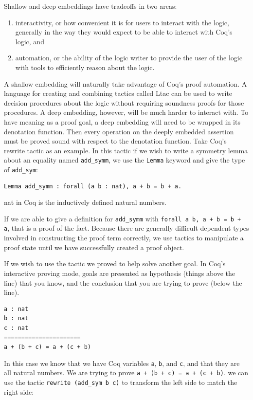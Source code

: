 \documentclass{puthesis}
\begin{document}
Shallow and deep embeddings have tradeoffs in two areas:

\begin{enumerate}
\item interactivity, or how convenient it is for users to interact
  with the logic, generally in the way they would expect to be able to
  interact with Coq's logic, and
\item automation, or the ability of the logic writer to provide the
  user of the logic with tools to efficiently reason about the logic.
\end{enumerate}

A shallow embedding will naturally take advantage of Coq's proof
automation. A language for creating and combining tactics called Ltac
can be used to write decision procedures about the logic without
requiring soundness proofs for those procedures. A deep embedding,
however, will be much harder to interact with. To have meaning as a
proof goal, a deep embedding will need to be wrapped in its denotation
function. Then every operation on the deeply embedded assertion must
be proved sound with respect to the denotation function. Take Coq's
rewrite tactic as an example. In this tactic if we wish to write a
symmetry lemma about an equality named \lstinline|add_symm|, we use
the \lstinline|Lemma| keyword and give the type of
\lstinline|add_sym|:

\begin{lstlisting}
Lemma add_symm : forall (a b : nat), a + b = b + a.
\end{lstlisting}
\noindent nat in Coq is the inductively defined natural numbers.

If we are able to give a definition for \lstinline|add_symm| with
\lstinline|forall a b, a + b = b + a|, that is a proof of the
fact. Because there are generally difficult dependent types involved
in constructing the proof term correctly, we use tactics to manipulate
a proof state until we have successfully created a proof object. 

If we wish to use the tactic we proved to help solve another goal. In
Coq's interactive proving mode, goals are presented as hypothesis
(things above the line) that you know, and the conclusion that you are
trying to prove (below the line). 

\begin{lstlisting}
a : nat
b : nat
c : nat
======================
a + (b + c) = a + (c + b) 
\end{lstlisting}

In this case we know that we have Coq variables \lstinline|a|,
\lstinline|b|, and \lstinline|c|, and that they are all natural
numbers. We are trying to prove \lstinline|a + (b + c) = a + (c + b)|.
we can use the tactic \lstinline|rewrite (add_sym b c)|
to transform the left side to match the right side:
\end{document}
